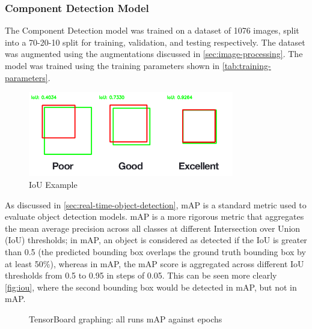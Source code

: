 \subsubsection{Component Detection Model}
The Component Detection model was trained on a dataset of 1076 images, split into a 70-20-10 split for training, validation, and testing respectively. The dataset was augmented using the augmentations discussed in \autoref{sec:image-processing}. The model was trained using the training parameters shown in \autoref{tab:training-parameters}.

\begin{figure}[H]
    \centering
    \includegraphics[width=0.8\textwidth]{imgs/articles/iou.png}
    \caption{IoU Example \cite{rosebrock_2016}}
    \label{fig:iou}
  \end{figure}
  
As discussed in \autoref{sec:real-time-object-detection}, mAP is a standard metric used to evaluate object detection models. mAP is a more rigorous metric that aggregates the mean average precision across all classes at different Intersection over Union (IoU) thresholds; in mAP, an object is considered as detected if the IoU is greater than 0.5 (the predicted bounding box overlaps the ground truth bounding box by at least 50\%), whereas in mAP, the mAP score is aggregated across different IoU thresholds from 0.5 to 0.95 in steps of 0.05. This can be seen more clearly \autoref{fig:iou}, where the second bounding box would be detected in mAP, but not in mAP.
  
\begin{figure}[H]
  \centering
   
  \caption{TensorBoard graphing: all runs mAP against epochs}
  \label{fig:metrics}
\end{figure}
  
